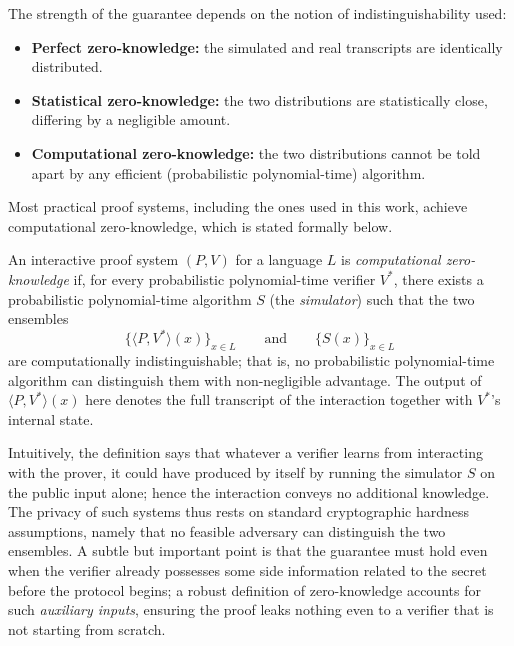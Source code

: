 \medskip

The strength of the guarantee depends on the notion of indistinguishability used:

\begin{itemize}
    \item \textbf{Perfect zero-knowledge:} the simulated and real transcripts are identically distributed.
    \item \textbf{Statistical zero-knowledge:} the two distributions are statistically close, differing by a negligible amount.
    \item \textbf{Computational zero-knowledge:} the two distributions cannot be told apart by any efficient (probabilistic polynomial-time) algorithm.
\end{itemize}

Most practical proof systems, including the ones used in this work, achieve computational zero-knowledge, which is stated formally below.

\begin{definition}
\label{def:czk}
An interactive proof system $(P, V)$ for a language $L$ is \emph{computational zero-knowledge} if, for every probabilistic polynomial-time verifier $V^{*}$, there exists a probabilistic polynomial-time algorithm $S$ (the \emph{simulator}) such that the two ensembles
\[
    \big\{ \langle P, V^{*} \rangle(x) \big\}_{x \in L}
    \qquad \text{and} \qquad
    \big\{ S(x) \big\}_{x \in L}
\]
are computationally indistinguishable; that is, no probabilistic polynomial-time algorithm can distinguish them with non-negligible advantage. The output of $\langle P, V^{*} \rangle(x)$ here denotes the full transcript of the interaction together with $V^{*}$'s internal state.
\end{definition}

Intuitively, the definition says that whatever a verifier learns from interacting with the prover, it could have produced by itself by running the simulator $S$ on the public input alone; hence the interaction conveys no additional knowledge. The privacy of such systems thus rests on standard cryptographic hardness assumptions, namely that no feasible adversary can distinguish the two ensembles. A subtle but important point is that the guarantee must hold even when the verifier already possesses some side information related to the secret before the protocol begins; a robust definition of zero-knowledge accounts for such \emph{auxiliary inputs}, ensuring the proof leaks nothing even to a verifier that is not starting from scratch.

